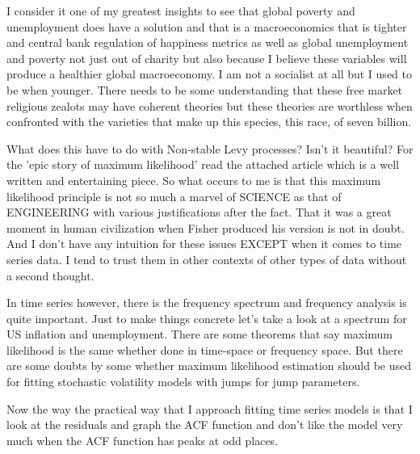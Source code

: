 \documentclass{amsart}
\begin{document}
I consider it one of my greatest insights to see that global poverty and unemployment does have a solution and that is a macroeconomics that is tighter and central bank regulation of happiness metrics as well as global unemployment and poverty not just out of charity but also because I believe these variables will produce a healthier global macroeconomy.  I am not a socialist at all but I used to be when younger.  There needs to be some understanding that these free market religious zealots may have coherent theories but these theories are worthless when confronted with the varieties that make up this species, this race, of seven billion.

What does this have to do with Non-stable Levy processes?  Isn't it beautiful?
For the 'epic story of maximum likelihood' read the attached article which is a well written and entertaining piece.  So what occurs to me is that this maximum likelihood principle is not so much a marvel of SCIENCE as that of ENGINEERING with various justifications after the fact.  That it was a great moment in human civilization when Fisher produced his version is not in doubt.  And I don't have any intuition for these issues EXCEPT when it comes to time series data.  I tend to trust them in other contexts of other types of data without a second thought.

In time series however, there is the frequency spectrum and frequency analysis is quite important.  Just to make things concrete let's take a look at a spectrum for US inflation and unemployment.  There are some theorems that say maximum likelihood is the same whether done in time-space or frequency space.  But there are some doubts by some whether maximum likelihood estimation should be used for fitting stochastic volatility models with jumps for jump parameters.  

Now the way the practical way that I approach fitting time series models is that I look at the residuals and graph the ACF function and don't like the model very much when the ACF function has peaks at odd places.  
\end{document}
